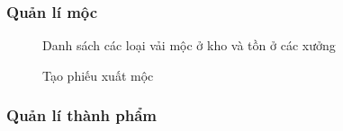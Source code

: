 \subsubsection{Quản lí mộc}

\begin{figure}[H]
    \begin{center}
        \caption{Danh sách các loại vải mộc ở kho và tồn ở các xưởng}
        \label{mockup_raw}
    \end{center}
\end{figure}

\begin{figure}[H]
    \begin{center}
        \caption{Tạo phiếu xuất mộc}
        \label{mockup_export_raw_1}
    \end{center}
\end{figure}

\subsubsection{Quản lí thành phẩm}

